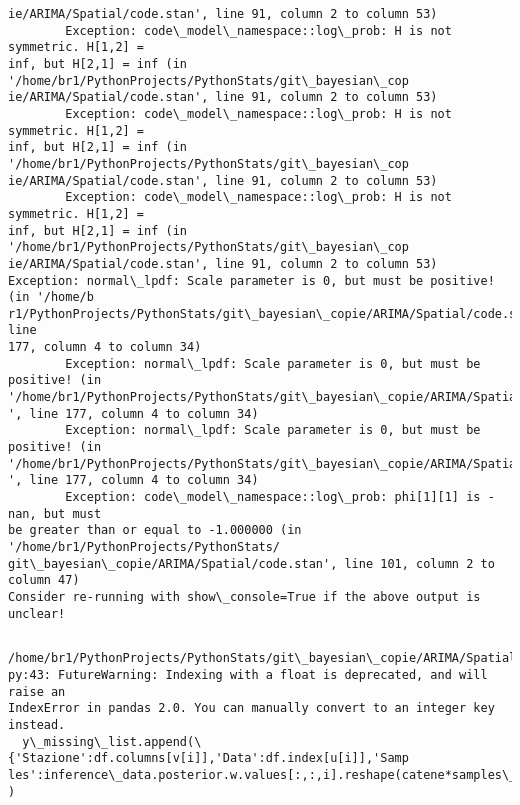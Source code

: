 \documentclass[11pt]{article}
\begin{document}
\begin{Verbatim}[commandchars=\\\{\}]
ie/ARIMA/Spatial/code.stan', line 91, column 2 to column 53)
        Exception: code\_model\_namespace::log\_prob: H is not symmetric. H[1,2] =
inf, but H[2,1] = inf (in '/home/br1/PythonProjects/PythonStats/git\_bayesian\_cop
ie/ARIMA/Spatial/code.stan', line 91, column 2 to column 53)
        Exception: code\_model\_namespace::log\_prob: H is not symmetric. H[1,2] =
inf, but H[2,1] = inf (in '/home/br1/PythonProjects/PythonStats/git\_bayesian\_cop
ie/ARIMA/Spatial/code.stan', line 91, column 2 to column 53)
        Exception: code\_model\_namespace::log\_prob: H is not symmetric. H[1,2] =
inf, but H[2,1] = inf (in '/home/br1/PythonProjects/PythonStats/git\_bayesian\_cop
ie/ARIMA/Spatial/code.stan', line 91, column 2 to column 53)
Exception: normal\_lpdf: Scale parameter is 0, but must be positive! (in '/home/b
r1/PythonProjects/PythonStats/git\_bayesian\_copie/ARIMA/Spatial/code.stan', line
177, column 4 to column 34)
        Exception: normal\_lpdf: Scale parameter is 0, but must be positive! (in 
'/home/br1/PythonProjects/PythonStats/git\_bayesian\_copie/ARIMA/Spatial/code.stan
', line 177, column 4 to column 34)
        Exception: normal\_lpdf: Scale parameter is 0, but must be positive! (in 
'/home/br1/PythonProjects/PythonStats/git\_bayesian\_copie/ARIMA/Spatial/code.stan
', line 177, column 4 to column 34)
        Exception: code\_model\_namespace::log\_prob: phi[1][1] is -nan, but must
be greater than or equal to -1.000000 (in '/home/br1/PythonProjects/PythonStats/
git\_bayesian\_copie/ARIMA/Spatial/code.stan', line 101, column 2 to column 47)
Consider re-running with show\_console=True if the above output is unclear!
    \end{Verbatim}

    \begin{Verbatim}[commandchars=\\\{\}]

    \end{Verbatim}

    \begin{Verbatim}[commandchars=\\\{\}]
/home/br1/PythonProjects/PythonStats/git\_bayesian\_copie/ARIMA/Spatial/fit\_arima.
py:43: FutureWarning: Indexing with a float is deprecated, and will raise an
IndexError in pandas 2.0. You can manually convert to an integer key instead.
  y\_missing\_list.append(\{'Stazione':df.columns[v[i]],'Data':df.index[u[i]],'Samp
les':inference\_data.posterior.w.values[:,:,i].reshape(catene*samples\_per\_chain)\}
)
    \end{Verbatim}
\end{document}
